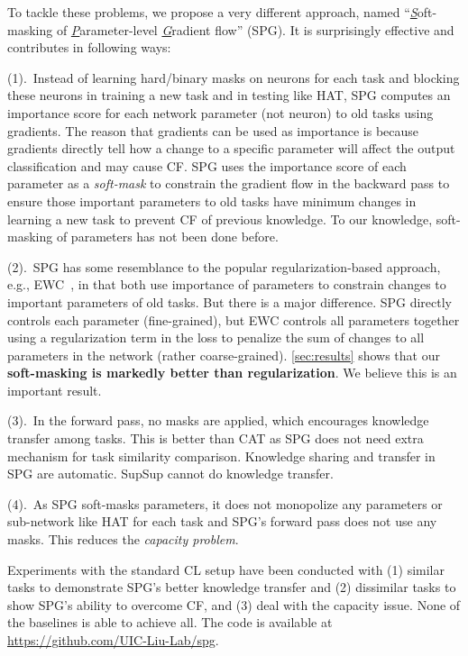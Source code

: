 To tackle these problems, we propose a very different approach, named ``\underline{\textit{S}}oft-masking of \underline{\textit{P}}arameter-level \underline{\textit{G}}radient flow'' (SPG). It is surprisingly effective and contributes in following ways:

(1).~Instead of learning hard/binary masks on neurons for each task and blocking these neurons in training a new task and in testing like HAT, SPG computes an importance score for each network parameter (not neuron) to old tasks using gradients. The reason that gradients can be used as importance is because gradients directly tell how a change to a specific parameter will affect the output classification and may cause CF. SPG uses the importance score of each parameter as a \textit{soft-mask} to constrain the gradient flow in the backward pass to ensure those important parameters to old tasks have minimum changes in learning a new task to prevent CF of previous knowledge. 
To our knowledge, soft-masking of parameters has not been done before. 

(2).~SPG has some resemblance to the popular regularization-based approach, e.g., EWC~\citep{ewc}, in that both use importance of parameters to constrain changes to important parameters of old tasks. But there is a major difference. SPG directly controls each parameter (fine-grained), but EWC controls all parameters together using a regularization term in the loss to penalize the sum of changes to all parameters in the network (rather coarse-grained). \cref{sec:results} shows that our \textbf{soft-masking is markedly better than regularization}. We believe this is an important result.


(3).~In the forward pass, no masks are applied, which encourages knowledge transfer among tasks. This is better than CAT as SPG does not need extra mechanism for task similarity comparison. Knowledge sharing and transfer in SPG are automatic. SupSup cannot do knowledge transfer. 


(4).~As SPG soft-masks parameters, it does not monopolize any parameters or sub-network like HAT for each task and SPG's forward pass does not use any masks. This reduces the \textit{capacity problem}. 


Experiments with the standard CL setup have been conducted with (1) similar tasks to demonstrate SPG's better knowledge transfer 
and (2) dissimilar tasks to show SPG's ability to overcome CF, and (3) deal with the capacity issue. None of the baselines is able to achieve all.
The code is available at \url{https://github.com/UIC-Liu-Lab/spg}.


